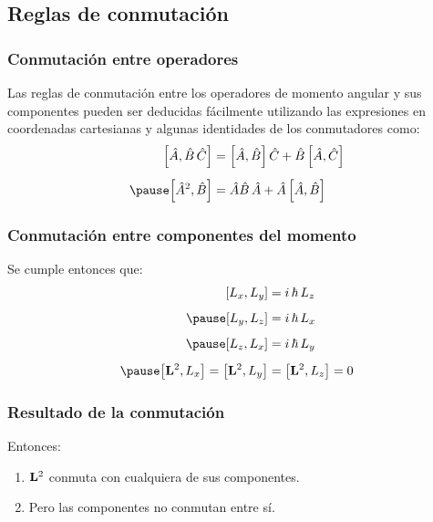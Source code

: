 \documentclass[12pt]{beamer}
\begin{document}

\subsection{Reglas de conmutación}

\begin{frame}
\frametitle{Conmutación entre operadores}
Las reglas de conmutación entre los operadores de momento angular y sus componentes pueden ser deducidas fácilmente utilizando las expresiones en coordenadas cartesianas y algunas identidades de los conmutadores como:
\pause
\begin{eqnarray*}
\begin{aligned}
\comm{\hat{A}}{\hat{B} \, \hat{C}} &= \comm{\hat{A}}{\hat{B}} \, \hat{C} + \hat{B} \, \comm{\hat{A}}{\hat{C}} \\[0.5em] \pause
\comm{\hat{A}^{2}}{\hat{B}} &= {\hat{A}}{\hat{B}} \, \hat{A} +  \hat{A} \, \comm{\hat{A}}{\hat{B}}
\end{aligned}
\end{eqnarray*}
\end{frame}
\begin{frame}
\frametitle{Conmutación entre componentes del momento}
Se cumple entonces que:
\pause
\begin{eqnarray}
\begin{aligned}
\comm{L_{x}}{L_{y}} &= i \, \hbar \, L_{z} \\[0.5em] \pause
\comm{L_{y}}{L_{z}} &= i \, \hbar \, L_{x} \\[0.5em] \pause
\comm{L_{z}}{L_{x}} &= i \, \hbar \, L_{y} \\[0.5em] \pause
\comm{\vb{L}^{2}}{L_{x}} = \comm{\vb{L}^{2}}{L_{y}} &= \comm{\vb{L}^{2}}{L_{z}} = 0
\end{aligned}
\label{eq:ecuacion_01_07}
\end{eqnarray}
\end{frame}
\begin{frame}
\frametitle{Resultado de la conmutación}
Entonces: \pause
{}
\begin{enumerate}[<+->]
\item $\vb{L}^{2}$ conmuta con cualquiera de sus componentes.
\item Pero las componentes no conmutan entre sí.
\end{enumerate}
\end{frame}
\end{document}
